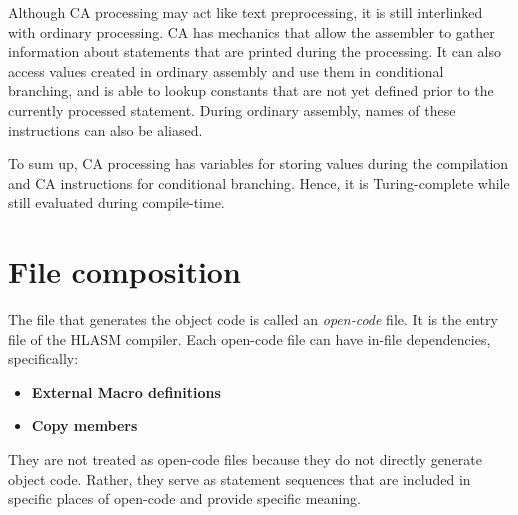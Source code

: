 \vspace{5mm}

Although CA processing may act like text preprocessing, it is still interlinked with ordinary processing. CA has mechanics that allow the assembler to gather information about statements that are printed during the processing. It can also access values created in ordinary assembly and use them in conditional branching, and is able to lookup constants that are not yet defined prior to the currently processed statement. During ordinary assembly, names of these instructions can also be aliased.

To sum up, CA processing has variables for storing values during the compilation and CA instructions for conditional branching. Hence, it is Turing-complete while still evaluated during compile-time.

\section{File composition}

The file that generates the object code is called an \emph{open-code} file. It is the entry file of the HLASM compiler. Each open-code file can have in-file dependencies, specifically:
\begin{itemize}
	\item \textbf{External Macro definitions}
	\item \textbf{Copy members}
\end{itemize}
They are not treated as open-code files because they do not directly generate object code. Rather, they serve as statement sequences that are included in specific places of open-code and provide specific meaning.


